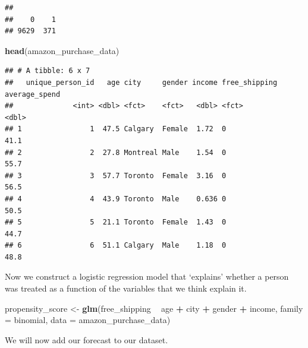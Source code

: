 \documentclass[
]{book}
\newenvironment{Shaded}{\begin{snugshade}}{\end{snugshade}}
\newcommand{\DataTypeTok}[1]{\textcolor[rgb]{0.13,0.29,0.53}{#1}}
\newcommand{\KeywordTok}[1]{\textcolor[rgb]{0.13,0.29,0.53}{\textbf{#1}}}
\newcommand{\NormalTok}[1]{#1}
\newcommand{\OperatorTok}[1]{\textcolor[rgb]{0.81,0.36,0.00}{\textbf{#1}}}
\newcommand{\StringTok}[1]{\textcolor[rgb]{0.31,0.60,0.02}{#1}}
\begin{document}
\begin{Shaded}
\end{Shaded}

\begin{verbatim}
## 
##    0    1 
## 9629  371
\end{verbatim}

\begin{Shaded}
\begin{Highlighting}[]
\KeywordTok{head}\NormalTok{(amazon_purchase_data)}
\end{Highlighting}
\end{Shaded}

\begin{verbatim}
## # A tibble: 6 x 7
##   unique_person_id   age city     gender income free_shipping average_spend
##              <int> <dbl> <fct>    <fct>   <dbl> <fct>                 <dbl>
## 1                1  47.5 Calgary  Female  1.72  0                      41.1
## 2                2  27.8 Montreal Male    1.54  0                      55.7
## 3                3  57.7 Toronto  Female  3.16  0                      56.5
## 4                4  43.9 Toronto  Male    0.636 0                      50.5
## 5                5  21.1 Toronto  Female  1.43  0                      44.7
## 6                6  51.1 Calgary  Male    1.18  0                      48.8
\end{verbatim}

Now we construct a logistic regression model that `explains' whether a person was treated as a function of the variables that we think explain it.

\begin{Shaded}
\begin{Highlighting}[]
\NormalTok{propensity_score <-}\StringTok{ }\KeywordTok{glm}\NormalTok{(free_shipping }\OperatorTok{~}\StringTok{ }\NormalTok{age }\OperatorTok{+}\StringTok{ }\NormalTok{city }\OperatorTok{+}\StringTok{ }\NormalTok{gender }\OperatorTok{+}\StringTok{ }\NormalTok{income, }
                        \DataTypeTok{family =}\NormalTok{ binomial,}
                        \DataTypeTok{data =}\NormalTok{ amazon_purchase_data)}
\end{Highlighting}
\end{Shaded}

We will now add our forecast to our dataset.
\end{document}
